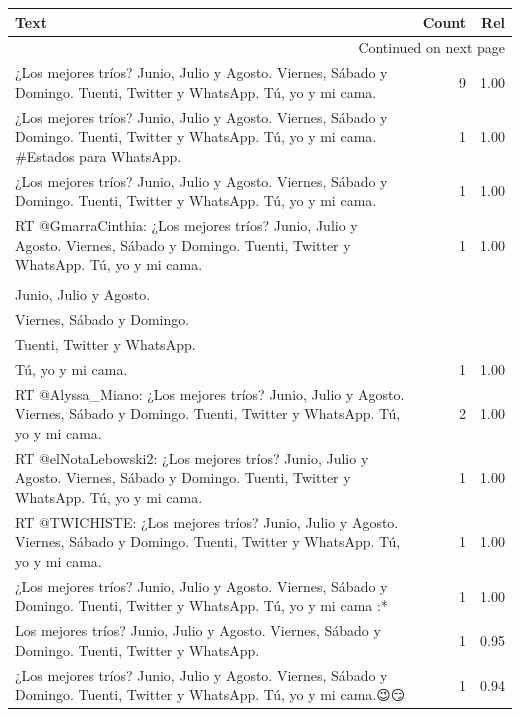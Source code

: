 \begin{longtable}{p{12.5cm}rr}
\toprule
Text & Count & Rel \\
\midrule
\endhead
\midrule
\multicolumn{3}{r}{{Continued on next page}} \\
\midrule
\endfoot

\bottomrule
\endlastfoot
¿Los mejores tríos? Junio, Julio y Agosto. Viernes, Sábado y Domingo. Tuenti, Twitter y WhatsApp. Tú, yo y mi cama. & 9 & 1.00 \\
¿Los mejores tríos? Junio, Julio y Agosto. Viernes, Sábado y Domingo. Tuenti, Twitter y WhatsApp. Tú, yo y mi cama. \#Estados para WhatsApp. & 1 & 1.00 \\
¿Los mejores tríos? Junio, Julio y Agosto. Viernes, Sábado y Domingo. Tuenti, Twitter y WhatsApp. Tú, yo y mi cama.💖💞👫 & 1 & 1.00 \\
RT @GmarraCinthia: ¿Los mejores tríos? Junio, Julio y Agosto. Viernes, Sábado y Domingo. Tuenti, Twitter y WhatsApp. Tú, yo y mi cama.💖💞👫 & 1 & 1.00 \\
\begin{tabular}[c]{@{}l@{}}¿Los mejores tríos?  \\ Junio, Julio y Agosto.  \\ Viernes, Sábado y Domingo.  \\ Tuenti, Twitter y WhatsApp.  \\ Tú, yo y mi cama.\end{tabular} & 1 & 1.00 \\
RT @Alyssa\_Miano: ¿Los mejores tríos? Junio, Julio y Agosto. Viernes, Sábado y Domingo. Tuenti, Twitter y WhatsApp. Tú, yo y mi cama. & 2 & 1.00 \\
RT @elNotaLebowski2: ¿Los mejores tríos? Junio, Julio y Agosto. Viernes, Sábado y Domingo. Tuenti, Twitter y WhatsApp. Tú, yo y mi cama. & 1 & 1.00 \\
RT @TWICHISTE: ¿Los mejores tríos? Junio, Julio y Agosto. Viernes, Sábado y Domingo. Tuenti, Twitter y WhatsApp. Tú, yo y mi cama. & 1 & 1.00 \\
¿Los mejores tríos? Junio, Julio y Agosto. Viernes, Sábado y Domingo. Tuenti, Twitter y WhatsApp. Tú, yo y mi cama :* & 1 & 1.00 \\
Los mejores tríos? Junio, Julio y Agosto. Viernes, Sábado y Domingo. Tuenti, Twitter y WhatsApp. & 1 & 0.95 \\
¿Los mejores tríos? Junio, Julio y Agosto. Viernes, Sábado y Domingo. Tuenti, Twitter y WhatsApp. Tú, yo y mi cama.😉😏 & 1 & 0.94 \\

\end{longtable}
